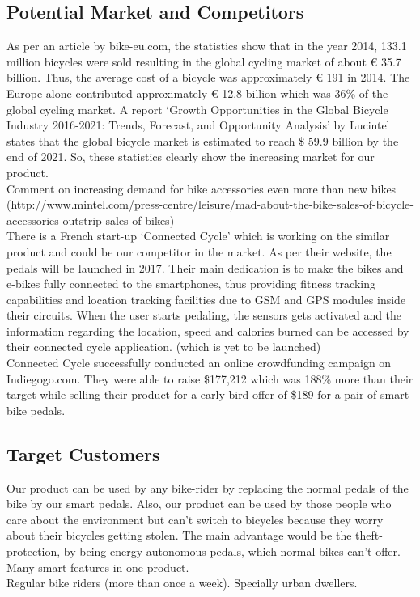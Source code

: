 \documentclass{article}
\begin{document}
	\subsection{Potential Market and Competitors}
	As per an article by bike-eu.com, the statistics show that in the year 2014, 133.1 million bicycles were sold resulting in the global cycling market of about € 35.7 billion. Thus, the average cost of a bicycle was approximately € 191 in 2014. The Europe alone contributed approximately € 12.8 billion which was 36\% of the global cycling market. A report ‘Growth Opportunities in the Global Bicycle Industry 2016-2021: Trends, Forecast, and Opportunity Analysis’ by Lucintel states that the global bicycle market is estimated to reach \$ 59.9 billion by the end of 2021. So, these statistics clearly show the increasing market for our product. \\
	Comment on increasing demand for bike accessories even more than new bikes (http://www.mintel.com/press-centre/leisure/mad-about-the-bike-sales-of-bicycle-accessories-outstrip-sales-of-bikes)\\[0.5cm]
	There is a French start-up ‘Connected Cycle’ which is working on the similar product and could be our competitor in the market. As per their website, the pedals will be launched in 2017. Their main dedication is to make the bikes and e-bikes fully connected to the smartphones, thus providing fitness tracking capabilities and location tracking facilities due to GSM and GPS modules inside their circuits. When the user starts pedaling, the sensors gets activated and the information regarding the location, speed and calories burned can be accessed by their connected cycle application. (which is yet to be launched)\\
	Connected Cycle successfully conducted an online crowdfunding campaign on Indiegogo.com. They were able to raise \$177,212 which was 188\% more than their target while selling their product for a early bird offer of \$189 for a pair of smart bike pedals.
	
	\subsection{Target Customers}
	Our product can be used by any bike-rider by replacing the normal pedals of the bike by our smart pedals. Also, our product can be used by those people who care about the environment but can’t switch to bicycles because they worry about their bicycles getting stolen. The main advantage would be the theft-protection, by being energy autonomous pedals, which normal bikes can’t offer. \\ 
	Many smart features in one product. \\ 
	Regular bike riders (more than once a week). Specially urban dwellers.
	
\end{document}
